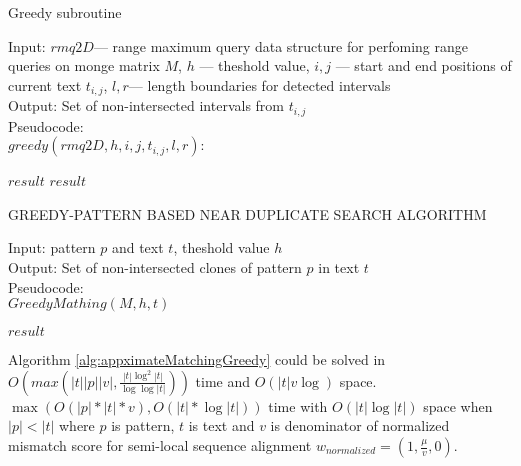 \begin{algorithm}[H]
\caption{Greedy subroutine}
\label{alg:rec}
Input: $rmq2D$--- range maximum query data structure for perfoming range queries on monge matrix $M$, $h$ --- theshold value, $i,j$ --- start and end positions of current text $t_{i,j}$, $l,r$--- length boundaries for detected intervals \\
Output: Set of non-intersected intervals from $t_{i,j}$\\
Pseudocode:\\
$greedy(rmq2D,h, i, j, t_{i,j},l,r ):$

\begin{algorithmic}[1]
\RETURN $result$
\ENDIF
{}
\ENDIF
{}
\ENDIF
\RETURN $result$
\end{algorithmic}
\end{algorithm}


\begin{algorithm}[H]
\caption{GREEDY-PATTERN BASED NEAR DUPLICATE
SEARCH ALGORITHM}
\label{alg:appximateMatchingGreedy}
Input: pattern $p$ and text $t$, theshold value $h$\\
Output: Set of non-intersected clones of pattern $p$ in text $t$\\
Pseudocode:\\
$GreedyMathing(M,h,t)$
\begin{algorithmic}[1]
\RETURN $result$
\end{algorithmic}
\end{algorithm}


\begin{theorem}
Algorithm \ref{alg:appximateMatchingGreedy} could  be solved in
$O(max(|t||p||v|,\frac{|t| \log^2 |t|}{\log \log |t|} ))$ time and $O(|t|v \log )$ space.
$\max ( O(|p| * |t| * v), O(|t| * \log |t|))$ time with $ O(|t| \log |t|)$ space when $|p|<|t|$ where $p$ is pattern, $t$ is text and $v$ is denominator of normalized mismatch score for semi-local sequence alignment
$w_{normalized} = (1,\frac{\mu}{v},0)$.
\end{theorem}

